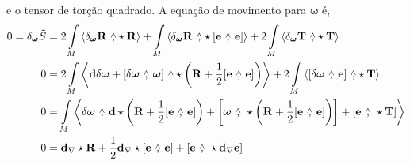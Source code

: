 e o tensor de torção quadrado. A equação de movimento para $\boldsymbol \omega$ é,
\begin{align*}
    0=\delta_{\boldsymbol\omega}\tilde S&=2\int\limits_{M}\expval{\delta_{\boldsymbol \omega}\vb R\ \wedgecomma \star \vb R}+\int\limits_{M}\expval{\delta_{\boldsymbol \omega}\vb R\ \wedgecomma \star \wedgecomm{\vb e}{\vb e}}+2\int\limits_{M}\expval{\delta_{\boldsymbol \omega}\vb T\ \wedgecomma \star \vb T}\\
    0&=2\int\limits_{M}\expval{\vb d\delta\boldsymbol \omega+\wedgecomm{\delta\boldsymbol\omega}{\boldsymbol\omega}\ \wedgecomma \star\qty( \vb R+\frac12\wedgecomm{\vb e}{\vb e})}+2\int\limits_{M}\expval{\wedgecomm{\delta\boldsymbol\omega}{\vb e}\ \wedgecomma \star \vb T}\\
    0&=\int\limits_{M}\expval{\delta\boldsymbol \omega\ \wedgecomma\ \vb d\star\qty( \vb R+\frac12\wedgecomm{\vb e}{\vb e})+\wedgecomm{\boldsymbol\omega}{\star\qty( \vb R+\frac12\wedgecomm{\vb e}{\vb e})}+\wedgecomm{\vb e}{\star\vb T}}\\
    0&=\vb d_\nabla\star \vb R+\frac12\vb d_\nabla\star\wedgecomm{\vb e}{\vb e}+\wedgecomm{\vb e}{\star\vb d_\nabla \vb e}
\end{align*}
